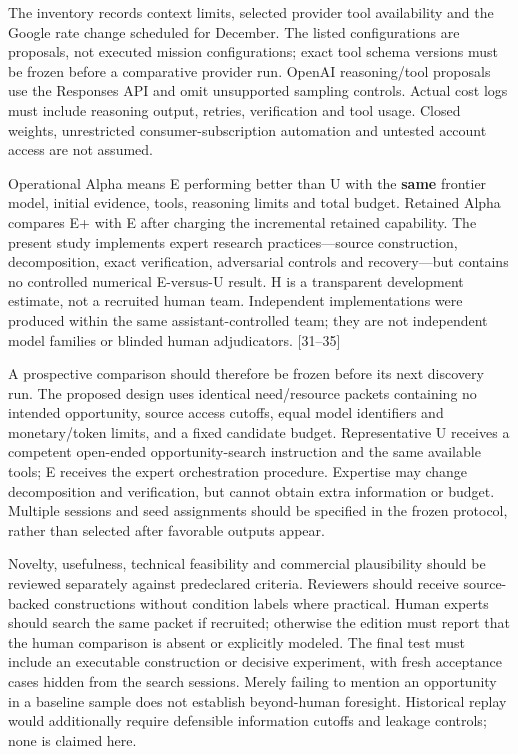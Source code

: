 \documentclass[
  11pt,
]{article}
\begin{document}
The inventory records context limits, selected provider tool
availability and the Google rate change scheduled for December. The
listed configurations are proposals, not executed mission
configurations; exact tool schema versions must be frozen before a
comparative provider run. OpenAI reasoning/tool proposals use the
Responses API and omit unsupported sampling controls. Actual cost logs
must include reasoning output, retries, verification and tool usage.
Closed weights, unrestricted consumer-subscription automation and
untested account access are not assumed.

Operational Alpha means E performing better than U with the
\textbf{same} frontier model, initial evidence, tools, reasoning limits
and total budget. Retained Alpha compares E+ with E after charging the
incremental retained capability. The present study implements expert
research practices---source construction, decomposition, exact
verification, adversarial controls and recovery---but contains no
controlled numerical E-versus-U result. H is a transparent development
estimate, not a recruited human team. Independent implementations were
produced within the same assistant-controlled team; they are not
independent model families or blinded human adjudicators. {[}31--35{]}

A prospective comparison should therefore be frozen before its next
discovery run. The proposed design uses identical need/resource packets
containing no intended opportunity, source access cutoffs, equal model
identifiers and monetary/token limits, and a fixed candidate budget.
Representative U receives a competent open-ended opportunity-search
instruction and the same available tools; E receives the expert
orchestration procedure. Expertise may change decomposition and
verification, but cannot obtain extra information or budget. Multiple
sessions and seed assignments should be specified in the frozen
protocol, rather than selected after favorable outputs appear.

Novelty, usefulness, technical feasibility and commercial plausibility
should be reviewed separately against predeclared criteria. Reviewers
should receive source-backed constructions without condition labels
where practical. Human experts should search the same packet if
recruited; otherwise the edition must report that the human comparison
is absent or explicitly modeled. The final test must include an
executable construction or decisive experiment, with fresh acceptance
cases hidden from the search sessions. Merely failing to mention an
opportunity in a baseline sample does not establish beyond-human
foresight. Historical replay would additionally require defensible
information cutoffs and leakage controls; none is claimed here.
\end{document}
